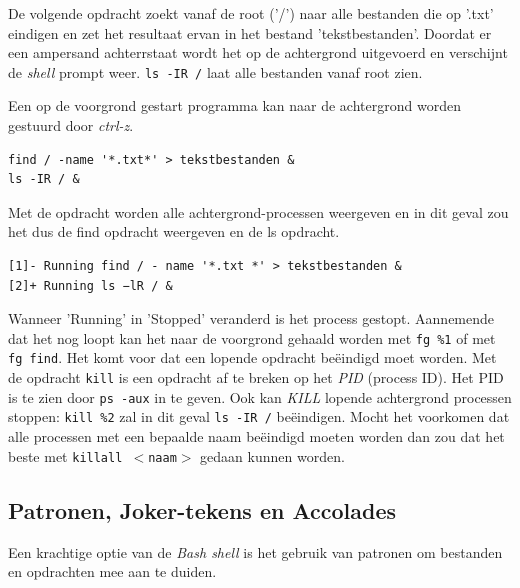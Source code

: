 De volgende opdracht zoekt vanaf de root ('/') naar alle bestanden die op '.txt' eindigen en zet het resultaat ervan in het bestand 'tekstbestanden'. Doordat er een ampersand achterrstaat wordt het op de achtergrond uitgevoerd en verschijnt de \emph{shell} prompt weer. \texttt{ls -IR /} laat alle bestanden vanaf root zien.

Een op de voorgrond gestart programma kan naar de achtergrond worden gestuurd door \emph{ctrl-z}.
\begin{lstlisting}
find / -name '*.txt*' > tekstbestanden &
ls -IR / &
\end{lstlisting}
Met de opdracht  worden alle achtergrond-processen weergeven en in dit geval zou het dus de find opdracht weergeven en de ls opdracht.
\begin{lstlisting}
[1]- Running find / - name '*.txt *' > tekstbestanden &
[2]+ Running ls −lR / &
\end{lstlisting}
Wanneer 'Running' in 'Stopped' veranderd is het process gestopt. Aannemende dat het nog loopt kan het naar de voorgrond gehaald worden met \texttt{fg \%1} of met \texttt{fg find}. Het komt voor dat een lopende opdracht be\"{e}indigd moet worden. Met de opdracht \texttt{kill} is een opdracht af te breken op het \emph{PID} (process ID). Het PID is te zien door \texttt{ps -aux} in te geven. Ook kan \emph{KILL} lopende achtergrond processen stoppen: \texttt{kill \%2} zal in dit geval \texttt{ls -IR /} be\"{e}indigen. Mocht het voorkomen dat alle processen met een bepaalde naam be\"{e}indigd moeten worden dan zou dat het beste met \texttt{killall $<$naam$>$} gedaan kunnen worden.

\subsection{Patronen, Joker-tekens en Accolades}
Een krachtige optie van de \emph{Bash shell} is het gebruik van patronen om bestanden en opdrachten mee aan te duiden.

